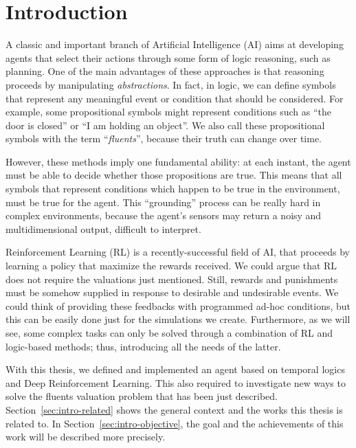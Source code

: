 \chapter{Introduction}

A classic and important branch of Artificial Intelligence (AI) aims at
developing agents that select their actions through some form of logic
reasoning, such as planning. One of the main advantages of these approaches is
that reasoning proceeds by manipulating \emph{abstractions}. In fact, in
logic, we can define symbols that represent any meaningful event or condition
that should be considered. For example, some propositional symbols might
represent conditions such as ``the door is closed'' or ``I am holding an
object''. We also call these propositional symbols with the term
``\emph{fluents}'', because their truth can change over time.

However, these methods imply one fundamental ability: at each instant, the
agent must be able to decide whether those propositions are true. This means
that all symbols that represent conditions which happen to be true in the
environment, must be true for the agent. This ``grounding'' process can be
really hard in complex environments, because the agent's sensors may return a
noisy and multidimensional output, difficult to interpret.

Reinforcement Learning (RL) is a recently-successful field of AI, that
proceeds by learning a policy that maximize the rewards received.  We could
argue that RL does not require the valuations just mentioned. Still, rewards
and punishments must be somehow supplied in response to desirable and
undesirable events. We could think of providing these feedbacks
with programmed ad-hoc conditions, but this can be easily done just for the
simulations we create. Furthermore, as we will see, some complex tasks can
only be solved through a combination of RL and logic-based methods; thus,
introducing all the needs of the latter.

With this thesis, we defined and implemented an agent based on temporal logics
and Deep Reinforcement Learning. This also required to investigate new ways to
solve the fluents valuation problem that has been just described.
Section~\ref{sec:intro-related} shows the general context and the works this
thesis is related to. In Section~\ref{sec:intro-objective}, the goal and the
achievements of this work will be described more precisely.


